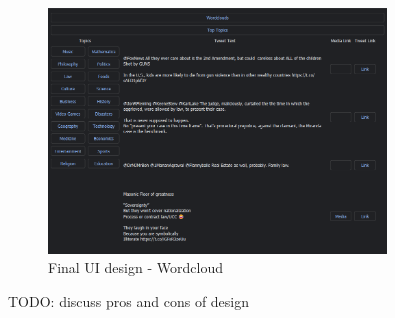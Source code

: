 \begin{figure}[h]
    \centering
    \includegraphics[width=0.8\textwidth]{../images/UI-dark-1-ft.png}
    \caption{Final UI design - Wordcloud}
    \label{fig:ui-findtopics}
\end{figure}

TODO: discuss pros and cons of design

